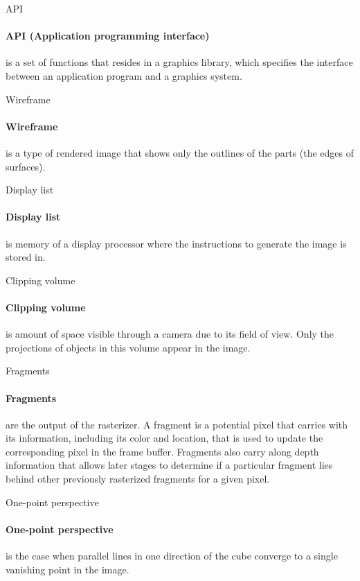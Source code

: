 \documentclass[10pt,a4paper]{article}
\begin{document}
\begin{enumerate}
		{\large \item API}
			\paragraph{API (Application programming interface)} is a set of functions that resides in a graphics library, which specifies the interface between an application program and a graphics system. \\
			
		{\large \item Wireframe}
			\paragraph{Wireframe} is a type of rendered image that shows only the outlines of the parts (the edges of surfaces).\\
		
		{\large \item Display list}
			\paragraph{Display list} is memory of a display processor where the instructions to generate the image is stored in.\\
			
		{\large \item Clipping volume}
			\paragraph{Clipping volume} is amount of space visible through a camera due to its field of view. Only the projections of objects in this volume appear in the image.\\
			
		{\large \item Fragments}
			\paragraph{Fragments} are the output of the rasterizer. A fragment is a potential pixel that carries with its information, including its color and location, that is used to update the corresponding pixel in the frame buffer. Fragments also carry along depth information that allows later stages to determine if a particular fragment lies behind other previously rasterized fragments for a given pixel. \\
			
		{\large \item One-point perspective}
			\paragraph{One-point perspective} is the case when parallel lines in one direction of the cube converge to a single vanishing point in the image. \\
	\end{enumerate}
\end{document}
